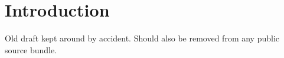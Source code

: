 \documentclass[11pt]{article}
\begin{document}
\section{Introduction}
\label{sec1}

Old draft kept around by accident. Should also be removed from any public
source bundle.
\end{document}
